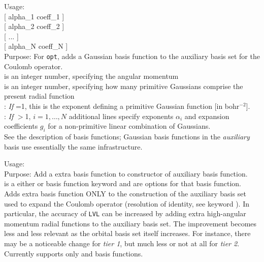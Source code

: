 {
  \noindent
  Usage:   
    \option{[alpha]} \\
    \hspace*{0.1\textwidth} [ alpha\_1  coeff\_1 ] \\
    \hspace*{0.1\textwidth} [ alpha\_2  coeff\_2 ] \\
    \hspace*{0.1\textwidth} [ ... ] \\
    \hspace*{0.1\textwidth} [ alpha\_N  coeff\_N ]
    \\[1.0ex]
  Purpose: For  \texttt{opt}, adds a Gaussian
    basis function to the auxiliary basis set for the Coulomb
    operator. \\[1.0ex]
   is an integer number, specifying the angular momentum \\ 
   is an integer number, specifying how many primitive Gaussians
    comprise the present radial function \\
   : \emph{If} =1, this is the exponent
    defining a primitive Gaussian function [in bohr$^{-2}$]. \\
    : 
    \emph{If} $>$1, $i=1,\dots,N$ additional lines specify
    exponents $\alpha_i$ and expansion coefficients $g_i$ for a
    non-primitive linear combination of Gaussians.\\
}
See the description of  basis functions;
Gaussian basis functions in the \emph{auxiliary} basis use essentially
the same infrastructure.

{
 \noindent
  Usage:       
  \\[1.0ex]
   Purpose: Add a extra basis function to constructor of auxiliary basis function.
  \\[1.0ex] 
    is a either  or  
    basis function keyword and  are options for that basis function.
  \\[1.0ex] 
}
Adds extra basis function ONLY to the construction of the auxiliary
basis set used to expand the Coulomb operator (resolution of identity,
see keyword ). In particular, the accuracy of 
 \texttt{LVL} can be increased by adding extra
high-angular momentum radial functions to the auxiliary basis set. The
improvement becomes less and less relevant as the orbital basis set
itself increases. For instance, there may be a noticeable change for
\emph{tier 1}, but much less or not at all for \emph{tier 2}. 
Currently supports only   and
 basis functions. 

